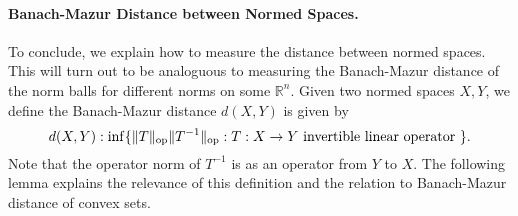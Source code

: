 \documentclass[11pt]{article}
\theoremstyle{plain}
\theoremstyle{plain}
\newcommand{\set}[1]{\{{#1}\}}
\newcommand{\R}{\ensuremath{\mathbb{R}}}
\begin{document}
% 
% 

\paragraph{\bf Banach-Mazur Distance between Normed Spaces.}

To conclude, we explain how to measure the distance between normed spaces. This
will turn out to be analoguous to measuring the Banach-Mazur distance of the
norm balls for different norms on some $\R^n$. Given two normed spaces $X,Y$, we
define the Banach-Mazur distance $d(X,Y)$ is given by
\begin{equation}
d(X,Y): \inf \set{\|T\|_{\rm op} \|T^{-1}\|_{\rm op}: T: X \rightarrow Y \text{
invertible linear operator } }.
\end{equation}
Note that the operator norm of $T^{-1}$ is as an operator from $Y$ to $X$. The
following lemma explains the relevance of this definition and the relation to
Banach-Mazur distance of convex sets. 
\end{document}
